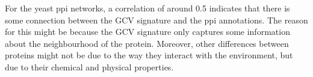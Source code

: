 \documentclass[11pt,a4paper,oneside]{report}
\begin{document}
  For the yeast ppi networks, a correlation of around 0.5 indicates that there is some connection between the GCV signature and the 
  ppi annotations. The reason for this might be because the GCV signature only captures some information about the neighbourhood of the protein. Moreover, other differences between proteins might not be due to the way they interact with the environment, but due to their chemical and physical properties.
  
\end{document}
